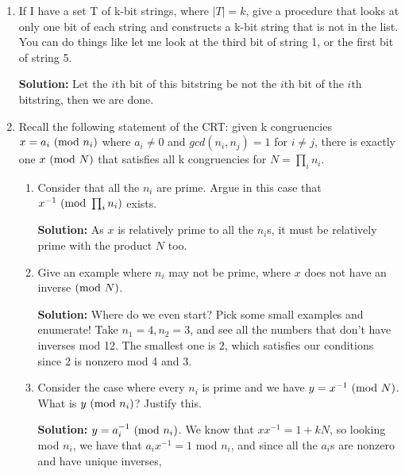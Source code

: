 \documentclass{article}
\newenvironment{solution}{

            \color{blue} \smallskip \textbf{Solution:}}{}
\begin{document}
\begin{enumerate}
\begin{solution}
            But $P(\textnormal{total packets corrupted} > m/2) = \sum_{i > m/2}^{n+m} {n + m \choose i} q^i (1-q)^{n+m-i}$.
        \end{solution}
        \item If I have a set T of k-bit strings, where $|T| = k$, give a procedure that looks at only one bit of each string and constructs a k-bit string that is not in the list. You can do things like let me look at the third bit of string 1, or the first bit of string 5.
        \begin{solution}
            Let the $i$th bit of this bitstring be not the $i$th bit of the $i$th bitstring, then we are done.
        \end{solution}
        \item Recall the following statement of the CRT: given k congruencies $x = a_i \textnormal{ (mod } n_i)$ where $a_i \neq 0$ and $gcd(n_i,n_j) = 1$ for $i \neq j$, there is exactly one $x \textnormal{ (mod } N)$ that satisfies all k congruencies for $N = \prod_i n_i$.
        \begin{enumerate}
            \item Consider that all the $n_i$ are prime. Argue in this case that $x^{-1} \textnormal{ (mod }\prod_i n_i)$ exists.
            \begin{solution}
                As $x$ is relatively prime to all the $n_i$s, it must be relatively prime with the product $N$ too. 
            \end{solution}
            \item Give an example where $n_i$ may not be prime, where $x$ does not have an inverse $\textnormal{(mod } N)$. 
            \begin{solution}
                Where do we even start? Pick some small examples and enumerate! Take $n_1 = 4, n_2 = 3$, and see all the numbers that don't have inverses mod 12.
                The smallest one is $2$, which satisfies our conditions since 2 is nonzero mod 4 and 3.
            \end{solution}
            \item Consider the case where every $n_i$ is prime and we have $y = x^{-1} \textnormal{ (mod } N)$. What is $y \textnormal{ (mod } n_i)$? Justify this.
            \begin{solution}
                $y = a_i^{-1} \textnormal{ (mod } n_i)$.
                We know that $x x^{-1} = 1 + kN$, so looking mod $n_i$, we have that $a_i x^{-1} = 1$ mod $n_i$, and since all the $a_i$s are nonzero and have unique inverses,

\end{solution}
\end{enumerate}
\end{enumerate}
\end{document}
